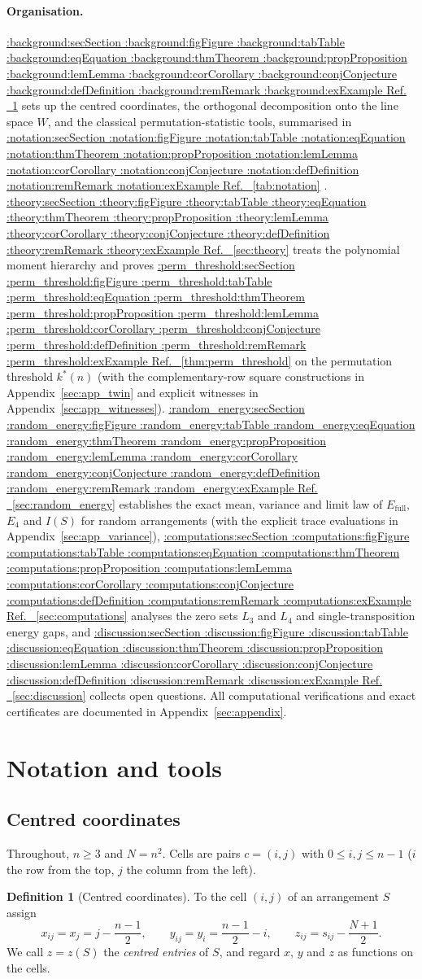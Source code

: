 \documentclass[11pt,a4paper]{article}
\makeatletter
\def\Cref@getprefix#1:#2\relax{#1}
\def\Cref@prefix@sec{sec}
\def\Cref@prefix@fig{fig}
\def\Cref@prefix@tab{tab}
\def\Cref@prefix@eq{eq}
\def\Cref@prefix@thm{thm}
\def\Cref@prefix@prop{prop}
\def\Cref@prefix@lem{lem}
\def\Cref@prefix@cor{cor}
\def\Cref@prefix@conj{conj}
\def\Cref@prefix@def{def}
\def\Cref@prefix@rem{rem}
\def\Cref@prefix@ex{ex}
\def\Cref@type@cap#1{%
  \edef\Cref@tmp{#1}%
  \ifx\Cref@tmp\Cref@prefix@sec Section%
  \else\ifx\Cref@tmp\Cref@prefix@fig Figure%
  \else\ifx\Cref@tmp\Cref@prefix@tab Table%
  \else\ifx\Cref@tmp\Cref@prefix@eq Equation%
  \else\ifx\Cref@tmp\Cref@prefix@thm Theorem%
  \else\ifx\Cref@tmp\Cref@prefix@prop Proposition%
  \else\ifx\Cref@tmp\Cref@prefix@lem Lemma%
  \else\ifx\Cref@tmp\Cref@prefix@cor Corollary%
  \else\ifx\Cref@tmp\Cref@prefix@conj Conjecture%
  \else\ifx\Cref@tmp\Cref@prefix@def Definition%
  \else\ifx\Cref@tmp\Cref@prefix@rem Remark%
  \else\ifx\Cref@tmp\Cref@prefix@ex Example%
  \else Ref.%
  \fi\fi\fi\fi\fi\fi\fi\fi\fi\fi\fi\fi
}
\DeclareRobustCommand{\Cref}[1]{%
  \begingroup
  \edef\Cref@label{#1}%
  \edef\Cref@prefix{\expandafter\Cref@getprefix\Cref@label:\relax}%
  \hyperref[#1]{\Cref@type@cap{\Cref@prefix}~\ref*{#1}}%
  \endgroup
}
\theoremstyle{plain}
\theoremstyle{definition}
\newtheorem{definition}[theorem]{Definition}
\theoremstyle{remark}
\newcommand{\Efull}{E_{\mathrm{full}}}
\newcommand{\Efour}{E_4}
\makeatother
\begin{document}
\paragraph{Organisation.}
\Cref{sec:background} sets up the centred coordinates, the orthogonal decomposition onto the line space $W$, and the classical permutation-statistic tools, summarised in \Cref{tab:notation}.
\Cref{sec:theory} treats the polynomial moment hierarchy and proves \Cref{thm:perm_threshold} on the permutation threshold $k^*(n)$ (with the complementary-row square constructions in Appendix~\ref{sec:app_twin} and explicit witnesses in Appendix~\ref{sec:app_witnesses}).
\Cref{sec:random_energy} establishes the exact mean, variance and limit law of $\Efull$, $\Efour$ and $I(S)$ for random arrangements (with the explicit trace evaluations in Appendix~\ref{sec:app_variance}), \Cref{sec:computations} analyses the zero sets $L_3$ and $L_4$ and single-transposition energy gaps, and \Cref{sec:discussion} collects open questions. All computational verifications and exact certificates are documented in Appendix~\ref{sec:appendix}.


\section{Notation and tools}
\label{sec:background}

\subsection{Centred coordinates}
\label{sec:bg_coords}

Throughout, $n\ge3$ and $N=n^2$.  Cells are pairs $c=(i,j)$ with $0\le i,j\le n-1$ ($i$ the row from the top, $j$ the column from the left).

\begin{definition}[Centred coordinates]
\label{def:coords}
To the cell $(i,j)$ of an arrangement $S$ assign
\begin{equation}
x_{ij}=x_j=j-\frac{n-1}{2},\qquad y_{ij}=y_i=\frac{n-1}{2}-i,\qquad z_{ij}=s_{ij}-\frac{N+1}{2}.
\label{eq:coords}
\end{equation}
We call $z=z(S)$ the \emph{centred entries} of $S$, and regard $x$, $y$ and $z$ as functions on the cells.
\end{definition}
\end{document}
